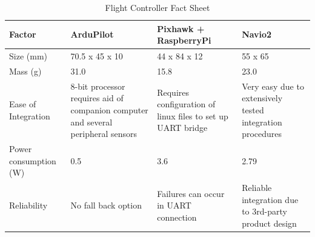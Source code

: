         \begin{table}[H]
			\centering
			\caption{Flight Controller Fact Sheet}
			\label{tab: flight controller}
			\begin{tabularx}{1\linewidth}{X X X X}
				\toprule
				Factor & ArduPilot & Pixhawk + RaspberryPi & Navio2 \\
			   \midrule
			   	Size (mm) & 70.5 x 45 x 10 & 44 x 84 x 12 & 55 x 65 \\
				Mass (g) & 31.0 & 15.8 & 23.0 \\
				Ease of Integration & 8-bit processor requires aid of companion \mbox{computer} and several peripheral sensors & Requires configuration of linux files to set up UART bridge & Very easy due to extensively tested integration procedures\\
				Power \newline consumption (W) & 0.5 & 3.6 & 2.79 \\
				Reliability & No fall back option & Failures can occur in UART connection & Reliable integration due to 3rd-party product \mbox{design} \\
				\bottomrule
			\end{tabularx}
		\end{table}
